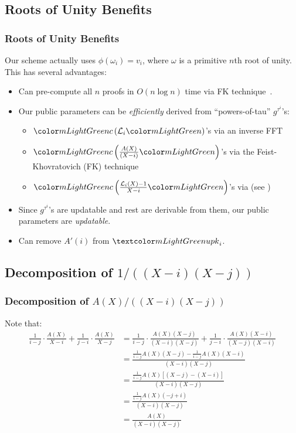 \subsection{Roots of Unity Benefits}
\begin{frame}
    \frametitle{Roots of Unity Benefits}

    Our scheme actually uses $\phi(\omega_i)=v_i$, where $\omega$ is a primitive $n$th \alert{root of unity}.\pause\xspace
    This has several advantages:\pause

    \begin{itemize}
        \item Can pre-compute all $n$ proofs in $O(n\log{n})$ time via FK technique~\cite{FK20}.\pause
        \item Our public parameters can be \textit{efficiently} derived from ``powers-of-tau'' $g^{\tau^i}$'s:\pause
        \begin{itemize}
            \item $\cm{\lagr_i}$'s via an inverse FFT~\cite{Virza17}\pause
            \item $\cm{\frac{A(X)}{(X-i)}}$'s via the Feist-Khovratovich (FK) technique~\cite{FK20}\pause
            \item $\cm{\frac{\lagr_i(X)-1}{X-i}}$'s via  (see \cite[Sec 3.4.5]{TAB+20e})\pause
        \end{itemize}
        \item Since $g^{\tau^i}$'s are updatable and rest are derivable from them, our public parameters are \textit{updatable}.\pause
        \item Can remove $A'(i)$ from $\upk_i$.
    \end{itemize}
\end{frame}

\subsection{Decomposition of $1/((X-i)(X-j))$}
\label{s:decompose-proof-update}
\begin{frame}
    \frametitle{Decomposition of $A(X)/\left((X-i)(X-j)\right)$}

    Note that:
    \begin{align}
    \label{eq:decompose-proof-update}
    \frac{1}{i-j}\cdot \frac{A(X)}{X-i} + \frac{1}{j-i}\cdot \frac{A(X)}{X-j}
        &= \frac{1}{i-j}\cdot \frac{A(X)(X-j)}{(X-i)(X-j)} + \frac{1}{j-i}\cdot \frac{A(X)(X-i)}{(X-j)(X-i)}\\
        &= \frac{\frac{1}{i-j}A(X)(X-j)-\frac{1}{i-j}A(X)(X-i)}{(X-i)(X-j)}\\
        &= \frac{\frac{1}{i-j}A(X)[(X-j)-(X-i)]}{(X-i)(X-j)}\\
        &= \frac{\frac{1}{i-j}A(X)(-j+i)}{(X-i)(X-j)}\\
        &= \frac{A(X)}{(X-i)(X-j)}
    \end{align}
\end{frame}

